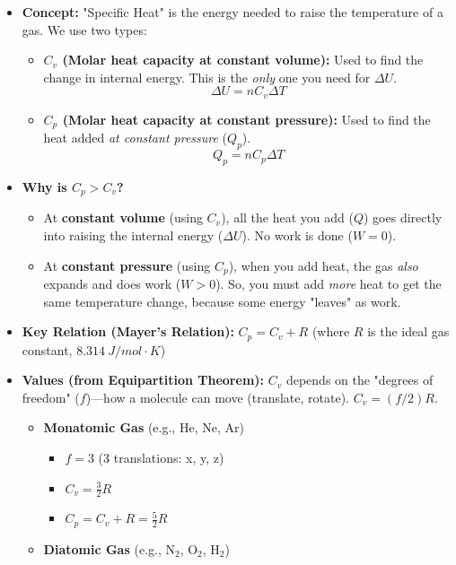 \documentclass[article]{article}
\begin{document}
\begin{itemize}
    \item \textbf{Concept:} "Specific Heat" is the energy needed to raise the temperature of a gas. We use two types:
    \begin{itemize}
        \item \textbf{$C_v$ (Molar heat capacity at constant volume):} Used to find the change in internal energy. This is the \textit{only} one you need for $\Delta U$.
            $$\Delta U = nC_v\Delta T$$
        \item \textbf{$C_p$ (Molar heat capacity at constant pressure):} Used to find the heat added \textit{at constant pressure} ($Q_p$).
            $$Q_p = nC_p\Delta T$$
    \end{itemize}
    \item \textbf{Why is $C_p > C_v$?}
    \begin{itemize}
        \item At \textbf{constant volume} (using $C_v$), all the heat you add ($Q$) goes directly into raising the internal energy ($\Delta U$). No work is done ($W=0$).
        \item At \textbf{constant pressure} (using $C_p$), when you add heat, the gas \textit{also} expands and does work ($W > 0$). So, you must add \textit{more} heat to get the same temperature change, because some energy "leaves" as work.
    \end{itemize}
    \item \textbf{Key Relation (Mayer's Relation):} $C_p = C_v + R$ (where $R$ is the ideal gas constant, $\SI{8.314}{J/mol\cdot K}$)
    \item \textbf{Values (from Equipartition Theorem):} $C_v$ depends on the "degrees of freedom" ($f$)—how a molecule can move (translate, rotate). $C_v = (f/2)R$.
    \begin{itemize}
        \item \textbf{Monatomic Gas} (e.g., He, Ne, Ar)
            \begin{itemize}
                \item $f = 3$ (3 translations: x, y, z)
                \item $C_v = \frac{3}{2}R$
                \item $C_p = C_v + R = \frac{5}{2}R$
            \end{itemize}
        \item \textbf{Diatomic Gas} (e.g., N$_2$, O$_2$, H$_2$)
            \begin{itemize}

\end{itemize}
\end{itemize}
\end{itemize}
\end{document}
